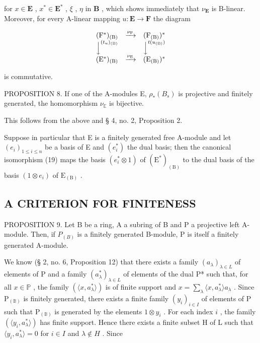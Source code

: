 for \(x \in \mathbf{E}\) , \(x^{*} \in \mathbf{E}^{*}\) , \(\xi\) , \(\eta\) in \(\mathbf{B}\) , which shows immediately that \(\nu_{\mathbf{E}}\) is B-linear. Moreover, for every A-linear mapping \(u: \mathbf{E} \to \mathbf{F}\) the diagram

\[
\begin{array}{c c c} (\mathrm{F} ^ {*}) _ {(\mathrm{B})} & \xrightarrow {\nu_ {\mathrm{F}}} & (\mathrm{F} _ {(\mathrm{B})}) ^ {*} \\ \Big \downarrow^ {(t _ {u}) _ {(\mathrm{B})}} & & \Big \downarrow^ {t (u _ {(\mathrm{B})})} \\ (\mathrm{E} ^ {*}) _ {(\mathrm{B})} & \xrightarrow {\nu_ {\mathrm{E}}} & (\mathrm{E} _ {(\mathrm{B})}) ^ {*} \end{array}
\]

is commutative.

PROPOSITION 8. If one of the A-modules E, \(\rho_{*}(B_{s})\) is projective and finitely generated, the homomorphism \(\nu_{\mathbb{E}}\) is bijective.

This follows from the above and § 4, no. 2, Proposition 2.

Suppose in particular that E is a finitely generated free A-module and let \((e_{i})_{1\leqslant i\leqslant n}\) be a basis of E and \((e_{i}^{*})\) the dual basis; then the canonical isomorphism (19) maps the basis \((e_{i}^{*}\otimes1)\) of \((\mathrm{E}^{*})_{(\mathrm{B})}\) to the dual basis of the basis \((1\otimes e_{i})\) of \(\mathrm{E}_{(\mathrm{B})}\) .

\subsection{A CRITERION FOR FINITENESS}

PROPOSITION 9. Let B be a ring, A a subring of B and P a projective left A-module. Then, if \(P_{(B)}\) is a finitely generated B-module, P is itself a finitely generated A-module.

We know (§ 2, no. 6, Proposition 12) that there exists a family \((a_{\lambda})_{\lambda \in L}\) of elements of P and a family \((a_{\lambda}^{*})_{\lambda \in L}\) of elements of the dual P* such that, for all \(x \in \mathbb{P}\) , the family \((\langle x, a_{\lambda}^{*} \rangle)\) is of finite support and \(x = \sum_{\lambda} \langle x, a_{\lambda}^{*} \rangle a_{\lambda}\) . Since \(\mathrm{P}_{(\mathbb{B})}\) is finitely generated, there exists a finite family \((y_{i})_{i \in I}\) of elements of P such that \(\mathrm{P}_{(\mathbb{B})}\) is generated by the elements \(1 \otimes y_{i}\) . For each index \(i\) , the family \((\langle y_{i}, a_{\lambda}^{*} \rangle)\) has finite support. Hence there exists a finite subset H of L such that \(\langle y_{i}, a_{\lambda}^{*} \rangle = 0\) for \(i \in I\) and \(\lambda \notin H\) . Since

